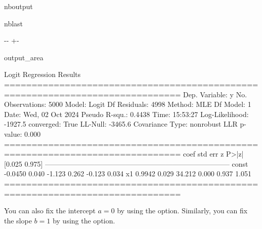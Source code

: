 \documentclass[letterpaper,10pt,english]{sphinxmanual}
\begin{document}
\begin{sphinxuseclass}{nboutput}
\begin{sphinxuseclass}{nblast}
{

\kern-\sphinxverbatimsmallskipamount\kern-\baselineskip
\kern+\FrameHeightAdjust\kern-\fboxrule
\vspace{\nbsphinxcodecellspacing}

\begin{sphinxuseclass}{output_area}
\begin{sphinxuseclass}{}


\begin{sphinxVerbatim}[commandchars=\\\{\}]
                           Logit Regression Results
==============================================================================
Dep. Variable:                      y   No. Observations:                 5000
Model:                          Logit   Df Residuals:                     4998
Method:                           MLE   Df Model:                            1
Date:                Wed, 02 Oct 2024   Pseudo R-squ.:                  0.4438
Time:                        15:53:27   Log-Likelihood:                -1927.5
converged:                       True   LL-Null:                       -3465.6
Covariance Type:            nonrobust   LLR p-value:                     0.000
==============================================================================
                 coef    std err          z      P>|z|      [0.025      0.975]
------------------------------------------------------------------------------
const         -0.0450      0.040     -1.123      0.262      -0.123       0.034
x1             0.9942      0.029     34.212      0.000       0.937       1.051
==============================================================================
\end{sphinxVerbatim}



\end{sphinxuseclass}
\end{sphinxuseclass}
}

\end{sphinxuseclass}
\end{sphinxuseclass}
\sphinxAtStartPar
You can also fix the intercept \(a=0\) by using the  option. Similarly, you can fix the slope \(b=1\) by using the  option.
\end{document}
